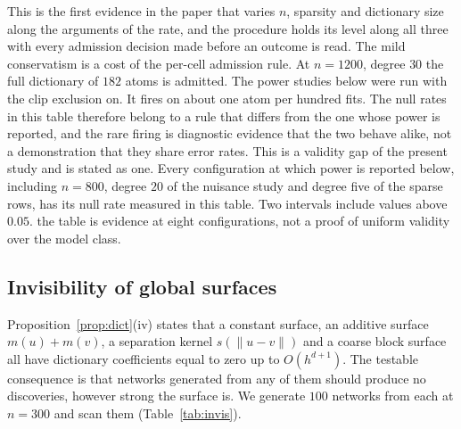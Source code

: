 \documentclass[11pt]{article}
\theoremstyle{definition}
\newcommand{\1}{\mathbf 1}\newcommand{\op}{\operatorname}
\begin{document}
This is the first evidence in the paper that varies $n$, sparsity and
dictionary size along the arguments of the rate, and the procedure holds its
level along all three with every admission decision made before an outcome is
read.  The mild conservatism is a cost of the per-cell admission rule.  At
$n=1200$, degree $30$ the full dictionary of $182$ atoms is admitted.  The
power studies below were run with the clip exclusion on.  It fires on about
one atom per hundred fits.  The null rates in this table therefore belong to
a rule that differs from the one whose power is reported, and the rare firing
is diagnostic evidence that the two behave alike, not a demonstration that
they share error rates.  This is a validity gap of the present study and is
stated as one.  Every configuration at which power is reported below, including $n=800$,
degree $20$ of the nuisance study and degree five of the sparse rows, has its
null rate measured in this table.  Two intervals include values above $0.05$.
the table is evidence at eight configurations, not a proof of uniform
validity over the model class.

\subsection{Invisibility of global surfaces}                \label{sec:invis}

Proposition~\ref{prop:dict}(iv) states that a constant surface, an additive
surface $m(u)+m(v)$, a separation kernel $s(\|u-v\|)$ and a coarse block
surface all have dictionary coefficients equal to zero up to $O(h^{d+1})$.
The testable consequence is that networks generated from any of them should
produce no discoveries, however strong the surface is.  We generate $100$
networks from each at $n=300$ and scan them (Table~\ref{tab:invis}).
\end{document}
